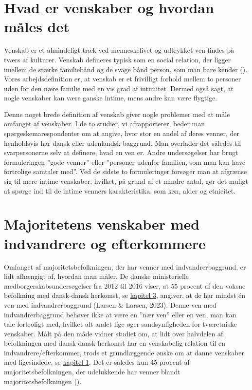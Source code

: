 \documentclass[
]{book}
\begin{document}
\section{Hvad er venskaber og hvordan måles det}\label{hvad-er-venskaber-og-hvordan-muxe5les-det}

Venskab er et almindeligt træk ved menneskelivet og udtrykket ven findes på tværs af kulturer. Venskab defineres typisk som en social relation, der ligger imellem de stærke familiebånd og de svage bånd person, som man bare kender (). Vores arbejdsdefinition er, at venskab er et frivilligt forhold mellem to personer uden for den nære familie med en vis grad af intimitet. Dermed også sagt, at nogle venskaber kan være ganske intime, mens andre kan være flygtige.

Denne noget brede definition af venskab giver nogle problemer med at måle omfanget af venskaber. I de to studier, vi afrapporterer, beder man spørgeskemarespondenter om at angive, hvor stor en andel af deres venner, der henholdsvis har dansk eller udenlandsk baggrund. Man overlader det således til svarpersonerne selv at definere, hvad en ven er. Andre undersøgelser har brugt formuleringen ''gode venner'' eller ''personer udenfor familien, som man kan have fortrolige samtaler med''. Ved de sidste to formuleringer forsøger man at afgrænse sig til mere intime venskaber, hvilket, på grund af et mindre antal, gør det muligt at spørge ind til de intime venners karakteristika, som køn, alder og etnicitet.

\section{Majoritetens venskaber med indvandrere og efterkommere}\label{majoritetens-venskaber-med-indvandrere-og-efterkommere}

Omfanget af majoritetsbefolkningen, der har venner med indvandrerbaggrund, er lidt afhængigt af, hvordan man måler. De danske ministerielle medborgerskabsundersøgelser fra 2012 til 2016 viser, at 55 procent af den voksne befolkning med dansk-dansk herkomst, se \hyperref[kap3]{kapitel 3}, angiver, at de har mindst én ven med indvandrerbaggrund (Larsen \& Larsen, 2023). Denne ven med indvandrerbaggrund behøver ikke at være en ''nær ven'' eller en ven, man kan tale fortroligt med, hvilket alt andet lige øger sandsynligheden for tværetniske venskaber. Målt på den måde vidner studiet om, at lidt over halvdelen af befolkningen med dansk-dansk herkomst har en venskabelig relation til en indvandrere/efterkommer, trods et grundlæggende ønske om at danne venskaber med ligesindede, se \hyperref[kap1]{kapitel 1}. Det er således kun 45 procent af majoritetsbefolkningen, der udelukkende har venner blandt majoritetsbefolkningen ().
\end{document}
